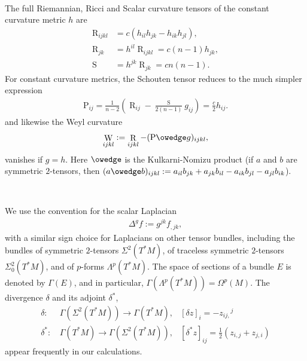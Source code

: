 \documentclass[10pt,reqno]{amsart}
\DeclareMathOperator{\dvol}{dV}
\DeclareMathOperator{\Rc}{R}
\renewcommand{\P}{\mathrm{P}}
\DeclareMathOperator{\W}{W}
\DeclareMathOperator{\Scal}{S}
\DeclareMathOperator{\R}{R}
\newcommand{\riem}{\R}
\newcommand{\riemdddd}[4]{\riem_{#1 #2 #3 #4}}
\newcommand{\inn}[2]{\left\langle #1 \, , \, #2 \right\rangle}
\begin{document}
\

The full Riemannian, Ricci and Scalar curvature tensors of the constant curvature metric $h$ are 
\begin{align} \label{eqn:constcurvature}
\riemdddd{i}{j}{k}{l} &= c ( h_{il} h_{jk} - h_{ik} h_{jl} ), \; \; \;  \\
\Rc_{jk} &= h^{il}\riemdddd{i}{j}{k}{l} = c (n -1 ) h_{jk},\\
\Scal &= h^{jk} \Rc_{jk} = c n (n-1).
\end{align}
For constant curvature metrics, the Schouten tensor reduces to the much simpler expression
\begin{align} \label{eqn:schouten const curv}%
\P_{ij} = \frac{1}{n-2} \left( \Rc_{ij} - \frac{\Scal}{2(n-1)} g_{ij}\right) = \frac{c}{2} h_{ij}.
\end{align}
and likewise the Weyl curvature 
\begin{align*}
\W_{ijkl} := \riem_{ijkl} - ( \P \owedge g)_{ijkl},
\end{align*}
vanishes if $g = h$.  Here $\owedge$ is the Kulkarni-Nomizu product (if $a$ and $b$ are symmetric $2$-tensors, then 
$(a \owedge b)_{ijkl} := a_{il} b_{jk} + a_{jk} b_{il} - a_{ik} b_{jl} - a_{jl} b_{ik}$). 

\ 

We use the convention for the scalar Laplacian
\begin{align*}
\Delta^g f := g^{jk} f_{,jk},
\end{align*}
with a similar sign choice for Laplacians on other tensor bundles, including the bundles of symmetric $2$-tensors $\Sigma^2( T^*M )$, of traceless symmetric $2$-tensors 
$\Sigma^2_0(T^* M)$, and of $p$-forms $\Lambda^p( T^*M)$.  The space of sections of a bundle $E$ is denoted by $\Gamma(E)$, and in particular,
$\Gamma(\Lambda^p(T^*M)) = \Omega^p(M)$. 
The divergence $\delta$ and its adjoint $\delta^*$, 
\begin{align*}
\delta : \, & \Gamma( \Sigma^2( T^*M ) ) \longrightarrow \Gamma( T^*M  ), & [\delta z]_{i} = - {z_{ij,}}^j   \\ 
\delta^* :\, &\Gamma( T^*M ) \longrightarrow \Gamma( \Sigma^2(T^*M) ),  & [\delta^* z]_{ij} = \frac{1}{2} ( z_{i,j} + z_{j,i} )
\end{align*}
appear frequently in our calculations. 
\end{document}

